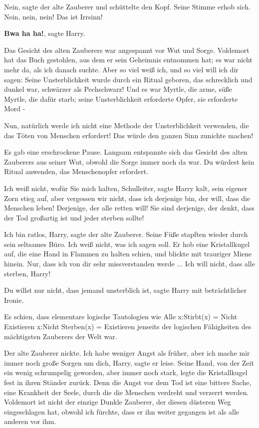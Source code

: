 \glqq{}Nein\grqq{}, sagte der alte Zauberer und schüttelte den Kopf. Seine Stimme
erhob sich. \glqq{}Nein, nein, nein! Das ist Irrsinn!\grqq{}

\glqq{}\textbf{Bwa ha ha!}\grqq{}, sagte Harry.

Das Gesicht des alten Zauberers war angespannt vor Wut und Sorge. \glqq{}
Voldemort hat das Buch gestohlen, aus dem er sein Geheimnis entnommen hat; es
war nicht mehr da, als ich danach suchte. Aber so viel weiß ich, und so viel
will ich dir sagen: Seine Unsterblichkeit wurde durch ein Ritual geboren, das
schrecklich und dunkel war, schwärzer als Pechschwarz! Und es war Myrtle, die
arme, süße Myrtle, die dafür starb; seine Unsterblichkeit erforderte Opfer, sie
erforderte Mord -\grqq{}

\glqq{}Nun, natürlich werde ich nicht eine Methode der Unsterblichkeit verwenden,
die das Töten von Menschen erfordert! Das würde den ganzen Sinn zunichte
machen!\grqq{}

Es gab eine erschrockene Pause. Langsam entspannte sich das Gesicht des alten
Zauberers aus seiner Wut, obwohl die Sorge immer noch da war. \glqq{}Du würdest
kein Ritual anwenden, das Menschenopfer erfordert.\grqq{}

\glqq{}Ich weiß nicht, wofür Sie mich halten, Schulleiter\grqq{}, sagte Harry
kalt, sein eigener Zorn stieg auf, \glqq{}aber vergessen wir nicht, dass ich
derjenige bin, der will, dass die Menschen leben! Derjenige, der alle retten
will! Sie sind derjenige, der denkt, dass der Tod großartig ist und jeder
sterben sollte!\grqq{}

\glqq{}Ich bin ratlos, Harry\grqq{}, sagte der alte Zauberer. Seine Füße stapften
wieder durch sein seltsames Büro. \glqq{}Ich weiß nicht, was ich sagen
soll.\grqq{} Er hob eine Kristallkugel auf, die eine Hand in Flammen zu halten
schien, und blickte mit trauriger Miene hinein. \glqq{}Nur, dass ich von dir sehr
missverstanden werde ... Ich will nicht, dass alle sterben, Harry!\grqq{}

\glqq{}Du willst nur nicht, dass jemand unsterblich ist\grqq{}, sagte Harry mit
beträchtlicher Ironie.

Es schien, dass elementare logische Tautologien wie Alle x:Stirbt(x) = Nicht
Existieren x:Nicht Sterben(x) = Existieren jenseits der logischen Fähigkeiten
des mächtigsten Zauberers der Welt war.

Der alte Zauberer nickte. \glqq{}Ich habe weniger Angst als früher, aber ich
mache mir immer noch große Sorgen um dich, Harry\grqq{}, sagte er leise. Seine
Hand, von der Zeit ein wenig schrumpelig geworden, aber immer noch stark, legte
die Kristallkugel fest in ihren Ständer zurück. \glqq{}Denn die Angst vor dem Tod
ist eine bittere Sache, eine Krankheit der Seele, durch die die Menschen
verdreht und verzerrt werden. Voldemort ist nicht der einzige Dunkle Zauberer,
der diesen düsteren Weg eingeschlagen hat, obwohl ich fürchte, dass er ihn
weiter gegangen ist als alle anderen vor ihm.\grqq{}

